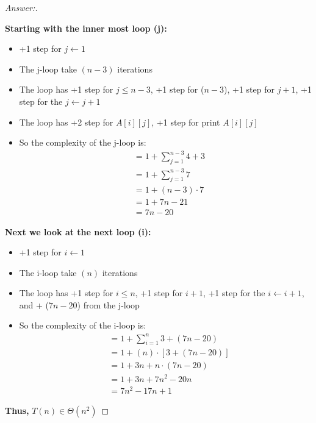 \documentclass[11pt]{article}
\theoremstyle{definition}
\theoremstyle{definition}
\theoremstyle{definition}
\begin{document}
\begin{proof}[Answer:] \
\DeclarePairedDelimiter{\ceil}{\lceil}{\rceil}
\item \textbf{Starting with the inner most loop (j):}
\begin{itemize}
\item +1 step for $j \gets 1$
\item The j-loop take $(n - 3)$ iterations
\item The loop has +1 step for $j \leq n - 3$, +1 step for ($n - 3$), +1 step for $j + 1$, +1 step for the $j \gets j + 1$
\item The loop has +2 step for $A[i][j]$, +1 step for print $A[i][j]$
\item So the complexity of the j-loop is:
\begin{align*}
&= 1+ \sum_{j=1}^{n - 3} 4 + 3\\
&= 1+ \sum_{j=1}^{n - 3} 7 \\
&= 1+ (n - 3) \cdot 7 \\
&= 1+ 7n - 21 \\
&= 7n - 20
\end{align*}
\end{itemize}

\item \textbf{Next we look at the next loop (i):}
\begin{itemize}
\item +1 step for $i \gets 1$
\item The i-loop take $(n)$ iterations
\item The loop has +1 step for $i \leq n$, +1 step for $i + 1$, +1 step for the $i \gets i + 1$, and + ($7n - 20$) from the j-loop
\item So the complexity of the i-loop is:
\begin{align*}
&= 1+ \sum_{i=1}^{n} 3 + (7n - 20) \\
&= 1+ (n) \cdot [3 + (7n - 20)] \\
&= 1+ 3n + n \cdot (7n - 20) \\
&= 1+ 3n + 7n^{2} - 20n \\
&= 7n^{2} - 17n + 1
\end{align*}
\end{itemize}
\item \textbf{Thus,} \color{red}$T(n) \in \Theta(n^{2})$
\end{proof}



\end{document}
